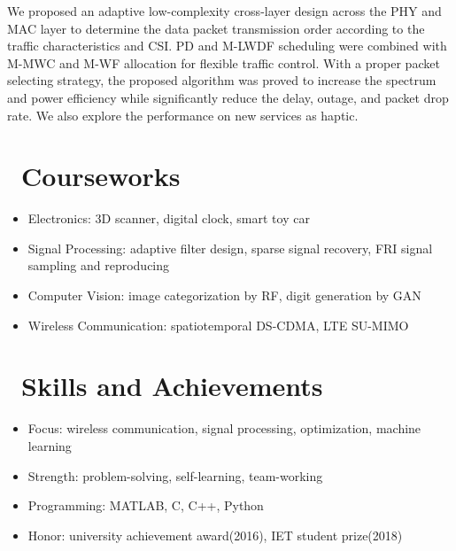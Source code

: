 \documentclass{resume}
\begin{document}
We proposed an adaptive low-complexity cross-layer design across the PHY and MAC layer to determine the data packet transmission order according to the traffic characteristics and CSI. PD and M-LWDF scheduling were combined with M-MWC and M-WF allocation for flexible traffic control. With a proper packet selecting strategy, the proposed algorithm was proved to increase the spectrum and power efficiency while significantly reduce the delay, outage, and packet drop rate. We also explore the performance on new services as haptic.

\section{\faTasks\ Courseworks}

\begin{itemize}[noitemsep,nolistsep]
  \item Electronics: 3D scanner, digital clock, smart toy car
  \item Signal Processing: adaptive filter design, sparse signal recovery, FRI signal sampling and reproducing
  \item Computer Vision: image categorization by RF, digit generation by GAN
  \item Wireless Communication: spatiotemporal DS-CDMA, LTE SU-MIMO
\end{itemize}

\section{\faHeartO\ Skills and Achievements}

\begin{itemize}[noitemsep,nolistsep]
  \item Focus: wireless communication, signal processing, optimization, machine learning
  \item Strength: problem-solving, self-learning, team-working
  \item Programming: MATLAB, C, C++, Python
  \item Honor: university achievement award(2016), IET student prize(2018)
\end{itemize}
\end{document}
